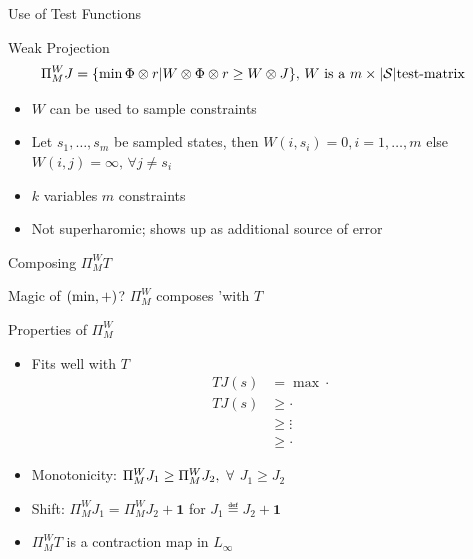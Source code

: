 \documentclass[10pt,handout]{beamer}
\begin{document}
\begin{frame}[fragile]{Use of Test Functions}
\begin{block}{Weak Projection}
\begin{align*}
\Pi^W_M J&=\{\min \Phi \otimes r | W\otimes \Phi \otimes r \geq W\otimes J\},\,W\text{~is~a~$m\times |\mathcal{S}|$test-matrix}
\end{align*}
\begin{itemize}
\item $W$ can be used to sample constraints
\item Let $s_1,\ldots,s_m$ be sampled states, then $W(i,s_i)=0,i=1,\ldots,m$ else $W(i,j)=\infty,\,\forall j\neq s_i$
\item $k$ variables $m$ constraints
\item Not superharomic; shows up as additional source of error
\end{itemize}
\end{block}
\end{frame}

\begin{frame}[fragile]{Composing $\Pi^W_M T$}
\begin{block}{Magic of $(\min,+)$?}
{{$\Pi^W_M$ composes {\color{orange}{`nicely}'}with $T$}}
\end{block}
\begin{block}{Properties of $\Pi^W_M$}
\begin{itemize}
\item Fits well with $T$
    \begin{align*}
    TJ(s)&=\max \cdot\\
    TJ(s)&\geq \cdot\\
    &\geq \vdots\\
    &\geq \cdot
    \end{align*}
\item {Monotonicity:} $\Pi^W_M J_1\geq \Pi^W_M J_2, \mbox{ } \forall$ $J_1\geq J_2$
\item {Shift:} $\Pi^W_M J_1= \Pi^W_M J_2+\mathbf{1}$ for $J_1\eqdef J_2+\mathbf{1}$
\item $\Pi^W_M T$ is a contraction map in $L_\infty$
\end{itemize}
\end{block}

\end{frame}
\end{document}
